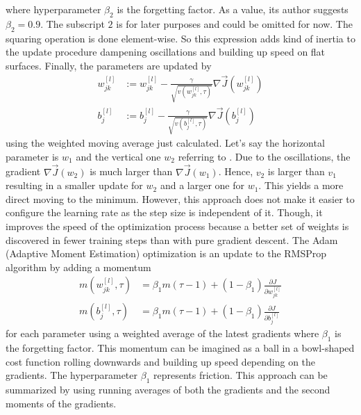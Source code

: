 where hyperparameter $\beta_2$ is the forgetting factor.
As a value, its author suggests $\beta_2 = 0.9$.
The subscript $2$ is for later purposes and could be omitted for now.
The squaring operation is done element-wise.
So this expression adds kind of inertia to the update procedure dampening oscillations and building up speed on flat surfaces.
Finally, the parameters are updated by
\begin{subequations}
	\begin{align}
		w^{[l]}_{jk} &:= w^{[l]}_{jk} - \frac{\gamma}{\sqrt{v(w^{[l]}_{jk}, \tau)}} \nabla \vec{J}(w^{[l]}_{jk}) \\
		b^{[l]}_{j} &:= b^{[l]}_{j} - \frac{\gamma}{\sqrt{v(b^{[l]}_{j}, \tau)}} \nabla \vec{J}(b^{[l]}_{j})
	\end{align}
\end{subequations}
using the weighted moving average just calculated.
Let's say the horizontal parameter is $w_1$ and the vertical one $w_2$ referring to .
Due to the oscillations, the gradient $\nabla \vec{J}(w_2)$ is much larger than $\nabla \vec{J}(w_1)$.
Hence, $v_2$ is larger than $v_1$ resulting in a smaller update for $w_2$ and a larger one for $w_1$.
This yields a more direct moving to the minimum.
However, this approach does not make it easier to configure the learning rate as the step size is independent of it.
Though, it improves the speed of the optimization process because a better set of weights is discovered in fewer training steps than with pure gradient descent.
The Adam (Adaptive Moment Estimation) optimization is an update to the RMSProp algorithm by adding a momentum
\begin{subequations}
	\label{eq:adam-first-momentum}
	\begin{align}
		m(w^{[l]}_{jk},\tau) &= \beta_1 m(\tau -1) + (1- \beta_1) \frac{\partial J}{\partial w^{[l]}_{jk}} \\
		m(b^{[l]}_{j},\tau) &= \beta_1 m(\tau -1) + (1- \beta_1) \frac{\partial J}{\partial b^{[l]}_{j}}
	\end{align}
\end{subequations}
for each parameter using a weighted average of the latest gradients\cite{DBLP:journals/corr/KingmaB14} where $\beta_1$ is the forgetting factor.
This momentum can be imagined as a ball in a bowl-shaped cost function rolling downwards and building up speed depending on the gradients.
The hyperparameter $\beta_1$ represents friction.
This approach can be summarized by using running averages of both the gradients and the second moments of the gradients.
